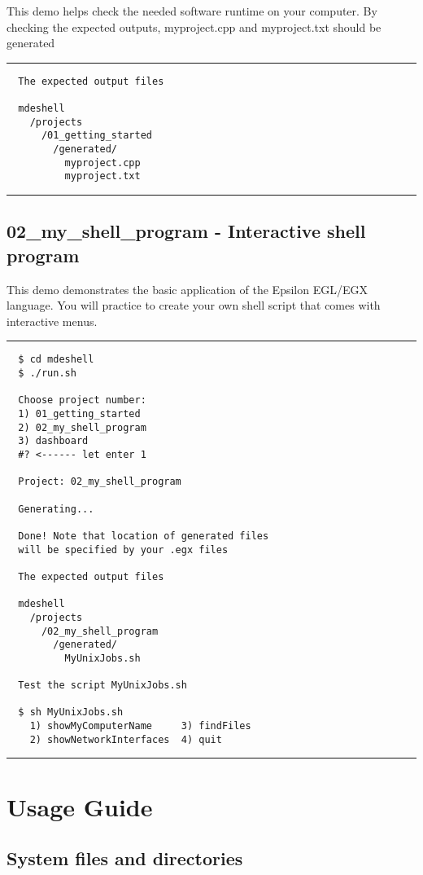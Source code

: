 \documentclass[12pt]{article}
\begin{document}
This demo helps check the needed software runtime on your computer. By checking the expected outputs, myproject.cpp and myproject.txt should be generated

\noindent\rule{8cm}{0.4pt}
\begin{lstlisting}
  The expected output files

  mdeshell
    /projects
      /01_getting_started
        /generated/
          myproject.cpp
          myproject.txt
\end{lstlisting}
\noindent\rule{8cm}{0.4pt}

\subsection*{02\_my\_shell\_program - Interactive shell program}

This demo demonstrates the basic application of the Epsilon EGL/EGX language. You will practice to create your own shell script that comes with interactive menus.

\noindent\rule{8cm}{0.4pt}
\begin{lstlisting}
  $ cd mdeshell
  $ ./run.sh 

  Choose project number:
  1) 01_getting_started
  2) 02_my_shell_program
  3) dashboard
  #? <------ let enter 1

  Project: 02_my_shell_program

  Generating...

  Done! Note that location of generated files
  will be specified by your .egx files

  The expected output files

  mdeshell
    /projects
      /02_my_shell_program
        /generated/
          MyUnixJobs.sh

  Test the script MyUnixJobs.sh

  $ sh MyUnixJobs.sh 
    1) showMyComputerName     3) findFiles
    2) showNetworkInterfaces  4) quit

\end{lstlisting}
\noindent\rule{8cm}{0.4pt}


\pagebreak 
\section*{Usage Guide}

\subsection*{System files and directories}
\end{document}
